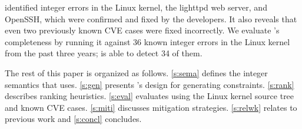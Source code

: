 \sys identified \nrbugs integer errors in the Linux kernel,
the lighttpd web server, and OpenSSH, which were confirmed and fixed
by the developers.  It also reveals that even two previously known
CVE cases were fixed incorrectly.
%
We evaluate \sys's completeness by running it against 36 known
integer errors in the Linux kernel from the past three years; \sys
is able to detect 34 of them.

The rest of this paper is organized as follows. \autoref{s:sema}
defines the integer semantics that \sys uses.  \autoref{s:gen}
presents \sys's design for generating constraints.  \autoref{s:rank}
describes ranking heuristics.  \autoref{s:eval} evaluates \sys using
the Linux kernel source tree and known CVE cases.
\autoref{s:miti} discusses mitigation strategies.
\autoref{s:relwk} relates \sys to previous work and \autoref{s:concl}
concludes.

